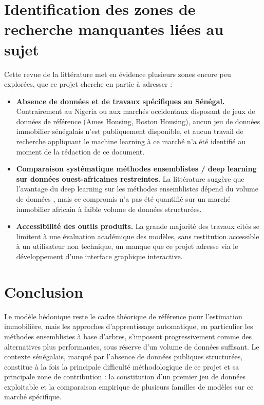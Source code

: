 \section{Identification des zones de recherche manquantes liées au sujet}

Cette revue de la littérature met en évidence plusieurs zones encore peu explorées, que ce
projet cherche en partie à adresser :

\begin{itemize}
  \item \textbf{Absence de données et de travaux spécifiques au Sénégal.} Contrairement au
  Nigeria \citep{nwankwo2023lagos} ou aux marchés occidentaux disposant de jeux de données de
  référence (Ames Housing, Boston Housing), aucun jeu de données immobilier sénégalais n'est
  publiquement disponible, et aucun travail de recherche appliquant le machine learning à ce
  marché n'a été identifié au moment de la rédaction de ce document.
  \item \textbf{Comparaison systématique méthodes ensemblistes / deep learning sur données
  ouest-africaines restreintes.} La littérature suggère que l'avantage du deep learning sur les
  méthodes ensemblistes dépend du volume de données \citep{yazdani2021mldl}, mais ce compromis
  n'a pas été quantifié sur un marché immobilier africain à faible volume de données
  structurées.
  \item \textbf{Accessibilité des outils produits.} La grande majorité des travaux cités se
  limitent à une évaluation académique des modèles, sans restitution accessible à un utilisateur
  non technique, un manque que ce projet adresse via le développement d'une interface graphique
  interactive.
\end{itemize}

\section{Conclusion}

Le modèle hédonique reste le cadre théorique de référence pour l'estimation immobilière, mais
les approches d'apprentissage automatique, en particulier les méthodes ensemblistes à base
d'arbres, s'imposent progressivement comme des alternatives plus performantes, sous réserve
d'un volume de données suffisant. Le contexte sénégalais, marqué par l'absence de données
publiques structurées, constitue à la fois la principale difficulté méthodologique de ce projet
et sa principale zone de contribution : la constitution d'un premier jeu de données exploitable
et la comparaison empirique de plusieurs familles de modèles sur ce marché spécifique.
